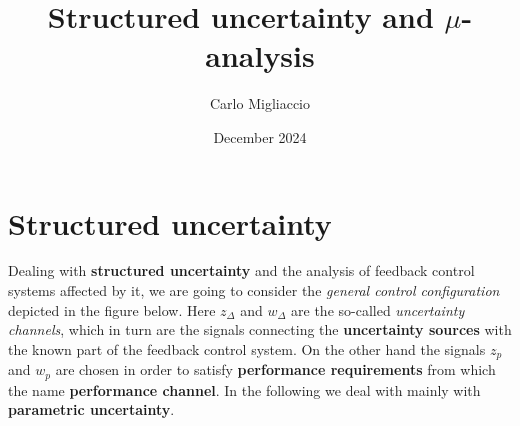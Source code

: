 \documentclass[a4paper, 12pt]{article}
\title{\textbf{Structured uncertainty and $\mu$-analysis}}
\author{Carlo Migliaccio
}
\date{December 2024}
\begin{document}
\maketitle

\section{Structured uncertainty}
Dealing with \textbf{structured uncertainty} and the analysis of feedback control systems affected by it, we are going to consider the \textit{general control configuration} depicted in the figure below.
Here $z_\Delta$ and $w_\Delta$ are the so-called \textit{uncertainty channels}, which in turn are the signals connecting the \textbf{uncertainty sources} with the known part of the feedback control system. On the other hand the signals $z_p$ and $w_p$ are chosen in order to satisfy \textbf{performance requirements} from which the name \textbf{performance channel}. In the following we deal with mainly with \textbf{parametric uncertainty}.
\end{document}

